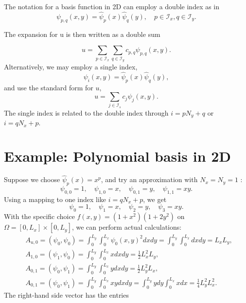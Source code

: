 \documentclass[../main.tex]{subfiles}
\begin{document}
	The notation for a basis function in 2D can employ a double index as in
	$$
	\psi_{p, q}(x, y)=\hat{\psi}_{p}(x) \hat{\psi}_{q}(y), \quad p \in \mathcal{I}_{x}, q \in \mathcal{I}_{y}.
	$$
	
	The expansion for u is then written as a double sum
	
	$$
	u=\sum_{p \in \mathcal{I}_{x}} \sum_{q \in \mathcal{I}_{y}} c_{p, q} \psi_{p, q}(x, y).
	$$
	Alternatively, we may employ a single index,
	$$
	\psi_{i}(x, y)=\hat{\psi}_{p}(x) \hat{\psi}_{q}(y),
	$$
	and use the standard form for $u$,
	$$
	u=\sum_{j \in \mathcal{I}_{s}} c_{j} \psi_{j}(x, y).
	$$
	The single index is related to the double index through $i=p N_{y}+q$ or $i=q N_{x}+p$.
	\bigbreak
	
	\section[Example: Polynomial basis in 2D]{Example: Polynomial basis in 2D}
	\label{sec:sec_8_2}
	\noindent Suppose we choose $\hat{\psi}_{p}(x)=x^{p}$, and try an approximation with $N_{x}=N_{y}=1$ :
	$$
	\psi_{0,0}=1, \quad \psi_{1,0}=x, \quad \psi_{0,1}=y, \quad \psi_{1,1}=x y.
	$$
	Using a mapping to one index like $i=q N_{x}+p$, we get
	$$
	\psi_{0}=1, \quad \psi_{1}=x, \quad \psi_{2}=y, \quad \psi_{3}=x y.
	$$
	With the specific choice $f(x, y)=\left(1+x^{2}\right)\left(1+2 y^{2}\right)$ on $\Omega=\left[0, L_{x}\right] \times\left[0, L_{y}\right]$, we can perform actual calculations:
	$$
	\begin{aligned}
		&A_{u, 0}=\left(\psi_{0}, \psi_{0}\right)=\int_{0}^{L_{y}} \int_{0}^{L_{x}} \psi_{0}(x, y)^{2} d x d y=\int_{0}^{L_{y}} \int_{0}^{L_{x}} d x d y=L_{x} L_{y}, \\
		&A_{1,0}=\left(\psi_{1}, \psi_{0}\right)=\int_{0}^{L_{y}} \int_{0}^{L_{x}} x d x d y=\frac{1}{2} L_{x}^{2} L_{y}, \\
		&A_{0,1}=\left(\psi_{0}, \psi_{1}\right)=\int_{0}^{L_{y}} \int_{0}^{L_{x}} y d x d y=\frac{1}{2} L_{y}^{2} L_{x}, \\
		&A_{0,1}=\left(\psi_{0}, \psi_{1}\right)=\int_{0}^{L_{y}} \int_{0}^{L_{x}} x y d x d y=\int_{0}^{L_{y}} y d y \int_{0}^{L_{x}} x d x=\frac{1}{4} L_{y}^{2} L_{x}^{2}.
	\end{aligned}
	$$
	The right-hand side vector has the entries
	
\end{document}
